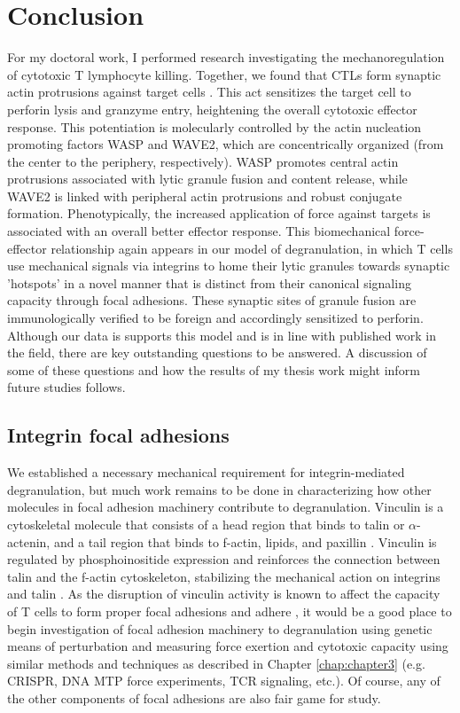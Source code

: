 \section{Conclusion} 

For my doctoral work, I performed research investigating the mechanoregulation of cytotoxic T lymphocyte killing. Together, we found that CTLs form synaptic actin protrusions against target cells \cite{Tamzalit2018}. This act sensitizes the target cell to perforin lysis and granzyme entry, heightening the overall cytotoxic effector response. This potentiation is molecularly controlled by the actin nucleation promoting factors WASP and WAVE2, which are concentrically organized (from the center to the periphery, respectively). WASP promotes central actin protrusions associated with lytic granule fusion and content release, while WAVE2 is linked with peripheral actin protrusions and robust conjugate formation. Phenotypically, the increased application of force against targets is associated with an overall better effector response. This biomechanical force-effector relationship again appears in our model of degranulation, in which T cells use mechanical signals via integrins to home their lytic granules towards synaptic 'hotspots' in a novel manner that is distinct from their canonical signaling capacity through focal adhesions. These synaptic sites of granule fusion are immunologically verified to be foreign and accordingly sensitized to perforin. Although our data is supports this model and is in line with published work in the field, there are key outstanding questions to be answered. A discussion of some of these questions and how the results of my thesis work might inform future studies follows.

\subsection{Integrin focal adhesions}

We established a necessary mechanical requirement for integrin-mediated degranulation, but much work remains to be done in characterizing how other molecules in focal adhesion machinery contribute to degranulation. Vinculin is a cytoskeletal molecule that consists of a head region that binds to talin or $\alpha$-actenin, and a tail region that binds to f-actin, lipids, and paxillin \cite{Goldmann2002}. Vinculin is regulated by phosphoinositide expression and reinforces the connection between talin and the f-actin cytoskeleton, stabilizing the mechanical action on integrins and talin \cite{Ezzell1997, Goldmann2002}. As the disruption of vinculin activity is known to affect the capacity of T cells to form proper focal adhesions and adhere \cite{Goldmann2002}, it would be a good place to begin investigation of focal adhesion machinery to degranulation using genetic means of perturbation and measuring force exertion and cytotoxic capacity using similar methods and techniques as described in Chapter \ref{chap:chapter3} (e.g. CRISPR, DNA MTP force experiments, TCR signaling, etc.). Of course, any of the other components of focal adhesions are also fair game for study.

